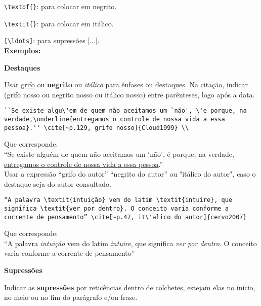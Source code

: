 \verb+\textbf{}+: para colocar em negrito.

\verb+\textit{}+: para colocar em it\'alico.

\verb+[\ldots]+: para supressões [...]. \\

\textbf{Exemplos:}

\begin{alineas}
\item

\textbf{Destaques}

Usar \underline{grifo} ou \textbf{negrito} ou \textit{it\'alico} para \^enfases ou destaques. Na citação, indicar (grifo nosso ou negrito nosso ou it\'alico nosso) entre par\^enteses, logo após a data.

\begin{verbatim}
``Se existe algu\'em de quem não aceitamos um `não', \'e porque, na 
verdade,\underline{entregamos o controle de nossa vida a essa 
pessoa}.'' \cite[~p.129, grifo nosso]{Cloud1999} \\
\end{verbatim}	

Que corresponde: \\

``Se existe algu\'em de quem não aceitamos um `não', \'e porque, na verdade,
\underline{entregamos o controle de nossa vida a essa pessoa}.'' \cite[~p.129, grifo nosso]{Cloud1999} \\

Usar a expressão “grifo do autor” “negrito do autor” ou "it\'alico do autor", caso o destaque seja do autor consultado.

\begin{verbatim}
“A palavra \textit{intuição} vem do latim \textit{intuire}, que 
significa \textit{ver por dentro}. O conceito varia conforme a
corrente de pensamento” \cite[~p.47, it\'alico do autor]{cervo2007}
\end{verbatim}

Que corresponde: \\

“A palavra \textit{intuição} vem do latim \textit{intuire}, que 
significa \textit{ver por dentro}. O conceito varia conforme a
corrente de pensamento” \cite[~p.47, it\'alico do autor]{cervo2007}\\

\item

\textbf{Supressões}

Indicar as \textbf{supressões} por retic\^encias dentro de colchetes, estejam elas no início, no meio ou no fim do par\'agrafo e/ou frase.


\end{alineas}
